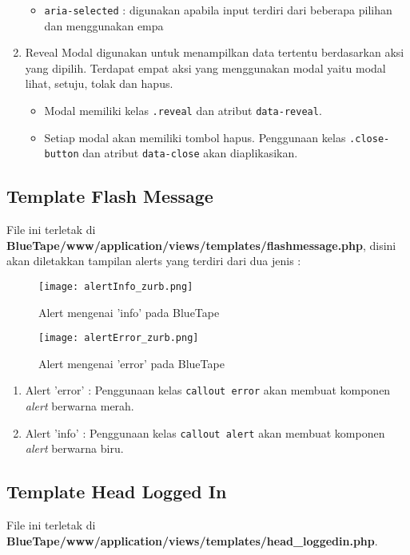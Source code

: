 \begin{enumerate}
\begin{itemize}
		\item \colorbox{mygray}{\texttt{aria-selected}} : digunakan apabila input terdiri dari beberapa pilihan dan menggunakan empa
	\end{itemize}	
	\item Reveal
	Modal digunakan untuk menampilkan data tertentu berdasarkan aksi yang dipilih. Terdapat empat aksi yang menggunakan modal yaitu modal lihat, setuju, tolak dan hapus.
	\begin{itemize}
		\item Modal memiliki kelas \colorbox{mygray}{\texttt{.reveal}} dan atribut \colorbox{mygray}{\texttt{data-reveal}}.
		\item Setiap modal akan memiliki tombol hapus. Penggunaan kelas \texttt{.close-button} dan atribut \colorbox{mygray}{\texttt{data-close}} akan diaplikasikan.			
	\end{itemize} 	 
\end{enumerate}
\subsection{Template Flash Message}
File ini terletak di \textbf{BlueTape/www/application/views/templates/flashmessage.php}, disini akan diletakkan tampilan alerts yang terdiri dari dua jenis :
\begin{figure} [H]
	\centering  
	\texttt{[image: alertInfo\_zurb.png]}  
	\caption{Alert mengenai 'info' pada BlueTape}	 
\end{figure}

\begin{figure} [H]
	\centering  
	\texttt{[image: alertError\_zurb.png]}  
	\caption{Alert mengenai 'error' pada BlueTape}	 
\end{figure}
\begin{enumerate}
	\item Alert 'error' : Penggunaan kelas \colorbox{mygray}{\texttt{callout error}} akan membuat komponen \textit{alert} berwarna merah.
	\item Alert 'info' : Penggunaan kelas \colorbox{mygray}{\texttt{callout alert}} akan membuat komponen \textit{alert} berwarna biru.
\end{enumerate}

\subsection{Template Head Logged In}
File ini terletak di \textbf{BlueTape/www/application/views/templates/head\_loggedin.php}.

